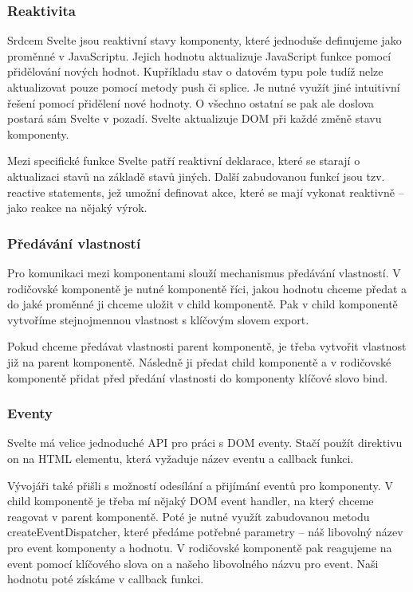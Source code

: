 \subsubsection{Reaktivita}

Srdcem Svelte jsou reaktivní stavy komponenty, které jednoduše definujeme jako proměnné v JavaScriptu. Jejich hodnotu aktualizuje JavaScript funkce pomocí přidělování nových hodnot. 
Kupříkladu stav o datovém typu pole tudíž nelze aktualizovat pouze pomocí metody push či splice. Je nutné využít jiné intuitivní řešení pomocí přidělení nové hodnoty.
O všechno ostatní se pak ale doslova postará sám Svelte v pozadí. Svelte aktualizuje DOM při každé změně stavu komponenty. 

Mezi specifické funkce Svelte patří reaktivní deklarace, které se starají o aktualizaci stavů na základě stavů jiných. 
Další zabudovanou funkcí jsou tzv. reactive statements, jež umožní definovat akce, které se mají vykonat reaktivně -- jako reakce na nějaký výrok.\cite{sveltehandbook,svelte}

\subsubsection{Předávání vlastností}

Pro komunikaci mezi komponentami slouží mechanismus předávání vlastností. 
V rodičovské komponentě je nutné komponentě říci, jakou hodnotu chceme předat a do jaké proměnné ji chceme uložit v child komponentě. 
Pak v child komponentě vytvoříme stejnojmennou vlastnost s klíčovým slovem export.

Pokud chceme předávat vlastnosti parent komponentě, je třeba vytvořit vlastnost již na parent komponentě. 
Následně ji předat child komponentě a v rodičovské komponentě přidat před předání vlastnosti do komponenty klíčové slovo bind.\cite{svelte}

\subsubsection{Eventy}

Svelte má velice jednoduché API pro práci s DOM eventy. Stačí použít direktivu on na HTML elementu, která vyžaduje název eventu a callback funkci.

Vývojáři také přišli s možností odesílání a přijímání eventů pro komponenty. 
V child komponentě je třeba mí nějaký DOM event handler, na který chceme reagovat v parent komponentě. 
Poté je nutné využít zabudovanou metodu createEventDispatcher, které předáme potřebné parametry -- náš libovolný název pro event komponenty a hodnotu. 
V rodičovské komponentě pak reagujeme na event pomocí klíčového slova on a našeho libovolného názvu pro event. Naši hodnotu poté získáme v callback funkci.\cite{sveltehandbook,svelte}

